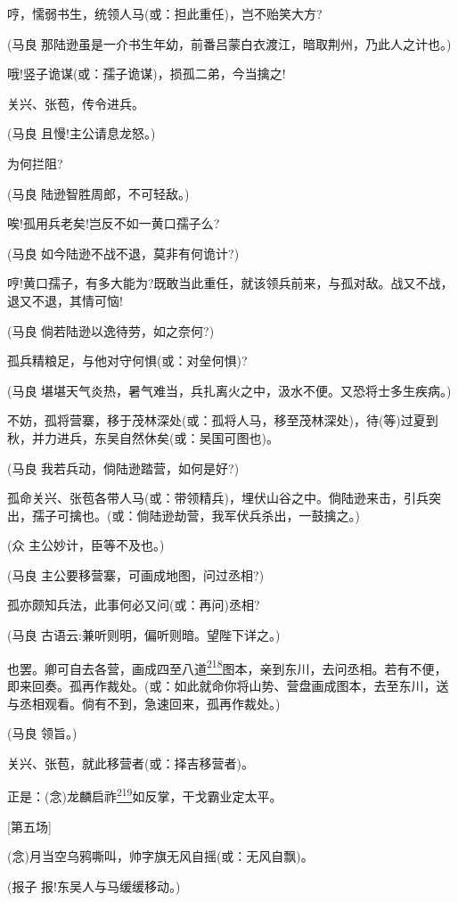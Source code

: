 哼，懦弱书生，统领人马(或：担此重任)，岂不贻笑大方?

(马良
那陆逊虽是一介书生年幼，前番吕蒙白衣渡江，暗取荆州，乃此人之计也。)

哦!竖子诡谋(或：孺子诡谋)，损孤二弟，今当擒之!

关兴、张苞，传令进兵。

(马良 且慢!主公请息龙怒。)

为何拦阻?

(马良 陆逊智胜周郎，不可轻敌。)

唉!孤用兵老矣!岂反不如一黄口孺子么?

(马良 如今陆逊不战不退，莫非有何诡计?)

哼!黄口孺子，有多大能为?既敢当此重任，就该领兵前来，与孤对敌。战又不战，退又不退，其情可恼!

(马良 倘若陆逊以逸待劳，如之奈何?)

孤兵精粮足，与他对守何惧(或：对垒何惧)?

(马良
堪堪天气炎热，暑气难当，兵扎离火之中，汲水不便。又恐将士多生疾病。)

不妨，孤将营寨，移于茂林深处(或：孤将人马，移至茂林深处)，待(等)过夏到秋，并力进兵，东吴自然休矣(或：吴国可图也)。

(马良 我若兵动，倘陆逊踏营，如何是好?)

孤命关兴、张苞各带人马(或：带领精兵)，埋伏山谷之中。倘陆逊来击，引兵突出，孺子可擒也。(或：倘陆逊劫营，我军伏兵杀出，一鼓擒之。)

(众 主公妙计，臣等不及也。)

(马良 主公要移营寨，可画成地图，问过丞相?)

孤亦颇知兵法，此事何必又问(或：再问)丞相?

(马良 古语云:兼听则明，偏听则暗。望陛下详之。)

也罢。卿可自去各营，画成四至八道\protect\hyperlink{fn218}{\textsuperscript{218}}图本，亲到东川，去问丞相。若有不便，即来回奏。孤再作裁处。(或：如此就命你将山势、营盘画成图本，去至东川，送与丞相观看。倘有不到，急速回来，孤再作裁处。)

(马良 领旨。)

关兴、张苞，就此移营者(或：择吉移营者)。

正是：(念)龙麟启祚\protect\hyperlink{fn219}{\textsuperscript{219}}如反掌，干戈霸业定太平。

{[}第五场{]}

(念)月当空乌鸦嘶叫，帅字旗无风自摇(或：无风自飘)。

(报子 报!东吴人与马缓缓移动。)

